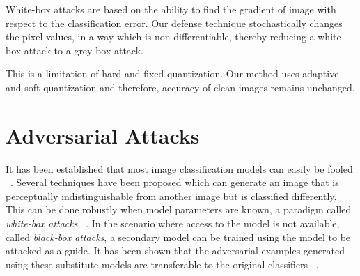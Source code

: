 White-box attacks are based on the ability to find the gradient of image with respect to the classification error. 
Our defense technique stochastically changes the pixel values, in a way which is non-differentiable, thereby reducing a white-box attack to a grey-box attack.

This is a limitation of hard and fixed quantization. 
Our method uses adaptive and soft quantization and therefore, accuracy of clean images remains unchanged.





\section{Adversarial Attacks\label{sec:advattacks}}
It has been established that most image classification models can easily be fooled ~\cite{Szegedy2013IntriguingPO,Goodfellow2014ExplainingAH}. 
Several techniques have been proposed which can generate an image that is perceptually indistinguishable from another image but is classified differently. 
This can be done robustly when model parameters are known, a paradigm called \textit{white-box attacks} ~\cite{Goodfellow2014ExplainingAH,Kurakin2016AdversarialEI,Madry2017TowardsDL,Carlini2017TowardsET}.
In the scenario where access to the model is not available, called \textit{black-box attacks}, a secondary model can be trained using the model to be attacked as a guide.
It has been shown that the adversarial examples generated using these substitute models are transferable to the original classifiers ~\cite{Papernot2016PracticalBA,Liu2016DelvingIT}.

